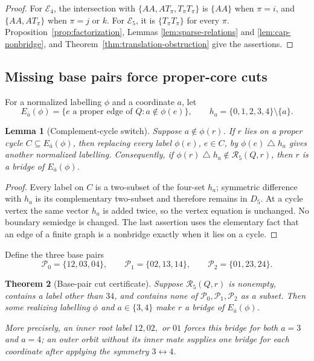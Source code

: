 \documentclass[11pt]{article}
\newtheorem{theorem}{Theorem}[section]
\newtheorem{lemma}[theorem]{Lemma}
\theoremstyle{definition}
\theoremstyle{remark}
\begin{document}
\begin{proof}
For \(\mathcal E_4\), the intersection with
\(\{AA,AT_\pi,T_\pi T_\pi\}\) is \(\{AA\}\) when \(\pi=i\), and
\(\{AA,AT_\pi\}\) when \(\pi=j\) or \(k\).  For
\(\mathcal E_5\), it is \(\{T_\pi T_\pi\}\) for every \(\pi\).
Proposition~\ref{prop:factorization}, Lemmas
\ref{lem:sparse-relations} and \ref{lem:cap-nonbridge}, and
Theorem~\ref{thm:translation-obstruction} give the assertions.
\end{proof}

\subsection{Missing base pairs force proper-core cuts}

For a normalized labelling \(\phi\) and a coordinate \(a\), let
\[
 E_{\bar a}(\phi)=
 \{e\text{ a proper edge of }Q:a\notin\phi(e)\},
 \qquad
 h_a=\{0,1,2,3,4\}\setminus\{a\}.
\]

\begin{lemma}[Complement-cycle switch]\label{lem:complement-switch}
Suppose \(a\notin\phi(r)\).  If \(r\) lies on a proper cycle
\(C\subseteq E_{\bar a}(\phi)\), then replacing every label
\(\phi(e)\), \(e\in C\), by \(\phi(e)\mathbin\triangle h_a\) gives
another normalized labelling.  Consequently, if
\(\phi(r)\mathbin\triangle h_a\notin\mathcal R_5(Q,r)\), then \(r\)
is a bridge of \(E_{\bar a}(\phi)\).
\end{lemma}

\begin{proof}
Every label on \(C\) is a two-subset of the four-set \(h_a\);
symmetric difference with \(h_a\) is its complementary two-subset and
therefore remains in \(D_5\).  At a cycle vertex the same vector
\(h_a\) is added twice, so the vertex equation is unchanged.  No
boundary semiedge is changed.  The last assertion uses the elementary
fact that an edge of a finite graph is a nonbridge exactly when it lies
on a cycle.
\end{proof}

Define the three base pairs
\[
 \mathcal P_0=\{12,03,04\},\qquad
 \mathcal P_1=\{02,13,14\},\qquad
 \mathcal P_2=\{01,23,24\}.
\]

\begin{theorem}[Base-pair cut certificate]
\label{thm:base-pair-certificate}
Suppose \(\mathcal R_5(Q,r)\) is nonempty, contains a label other than
\(34\), and contains none of
\(\mathcal P_0,\mathcal P_1,\mathcal P_2\) as a subset.  Then some
realizing labelling \(\phi\) and \(a\in\{3,4\}\) make \(r\) a bridge of
\(E_{\bar a}(\phi)\).

More precisely, an inner root label \(12,02,\) or \(01\) forces this
bridge for both \(a=3\) and \(a=4\); an outer orbit without its inner
mate supplies one bridge for each coordinate after applying the
symmetry \(3\leftrightarrow4\).
\end{theorem}
\end{document}
